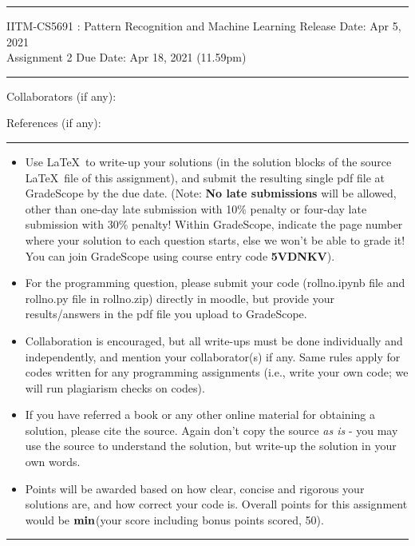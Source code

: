 \documentclass[solution,addpoints,12pt]{exam}
\begin{document}
\hrule
\vspace{3mm}
\noindent 
{\sf IITM-CS5691 : Pattern Recognition and Machine Learning  \hfill Release Date: Apr 5, 2021}
\\
\noindent 
{\sf Assignment 2 \hfill Due Date: Apr 18, 2021 (11.59pm)}
\vspace{3mm}
\hrule
\vspace{3mm}

\noindent
{{\sf Collaborators (if any): }} %

\noindent
{{\sf References (if any): 
}} %


\vspace{3mm}
\hrule
{\small
\begin{itemize}
\item Use \LaTeX\ to write-up your solutions (in the solution blocks of the source \LaTeX\  file of this assignment), and submit the resulting single pdf file at GradeScope by the due date. (Note: {\bf No late submissions} will be allowed, other than one-day late submission with 10\% penalty or four-day late submission with 30\% penalty! Within GradeScope, indicate the page number where your solution to each question starts, else we won't be able to grade it! You can join GradeScope using course entry code \textbf{5VDNKV}).  
\item For the programming question, please submit your code (rollno.ipynb file and rollno.py file in rollno.zip) directly in moodle, but provide your results/answers in the pdf file you upload to GradeScope.
\item Collaboration is encouraged, but all write-ups must be done individually and independently, and mention your collaborator(s) if any. Same rules apply for codes written for any programming assignments (i.e., write your own code; we will run plagiarism checks on codes).
\item  If you have referred a book or any other online material for obtaining a solution, please cite the source. Again don't copy the source {\it as is} - you may use the source to understand the solution, but write-up the solution in your own words. 
\item Points will be awarded based on how clear, concise and rigorous your solutions are, and how correct your code is. Overall points for this assignment would be ${\bf min}$(your score including bonus points scored, 50).
\end{itemize}
}
\hrule
\end{document}
